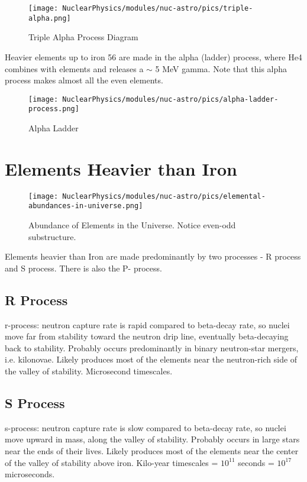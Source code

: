             \begin{figure}[H]
                \centering
                \texttt{[image: NuclearPhysics/modules/nuc-astro/pics/triple-alpha.png]}
            \caption{Triple Alpha Process Diagram}
            \end{figure}
            
            
            
            Heavier elements up to iron 56 are made in the alpha (ladder) process, where He4 combines with elements and releases a $\sim$ 5 MeV gamma. Note that this alpha process makes almost all the even elements. 
           
            \begin{figure}[H]
                \centering
                \texttt{[image: NuclearPhysics/modules/nuc-astro/pics/alpha-ladder-process.png]}
            \caption{Alpha Ladder}
            \end{figure}
    \section{Elements Heavier than Iron}
        
            \begin{figure}[H]
                \centering
                \texttt{[image: NuclearPhysics/modules/nuc-astro/pics/elemental-abundances-in-universe.png]}
            \caption{Abundance of Elements in the Universe. Notice even-odd substructure.}
            \end{figure}
            
            Elements heavier than Iron are made predominantly by two processes - R process and S process. There is also the P- process.
    
        \subsection{R Process}
            r-process: neutron capture rate is rapid compared to beta-decay rate, so nuclei move far from stability toward the neutron drip line, eventually beta-decaying back to stability. Probably occurs predominantly in binary neutron-star mergers, i.e. kilonovae. Likely produces most of the elements near the neutron-rich side of the valley of stability. Microsecond timescales.
        \subsection{S Process}    
            s-process: neutron capture rate is slow compared to beta-decay rate, so nuclei move upward in mass, along the valley of stability. Probably occurs in large stars near the ends of their lives. Likely produces most of the elements near the center of the valley of stability above iron. Kilo-year timescales = $10^{11}$ seconds = $10^{17}$ microseconds.
